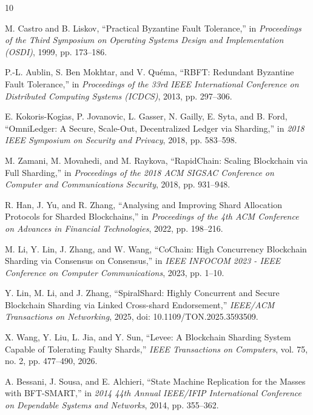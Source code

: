\documentclass[10pt,conference]{IEEEtran}
\begin{document}
\begin{thebibliography}{10}

M. Castro and B. Liskov, ``Practical Byzantine Fault Tolerance,'' in \emph{Proceedings of the Third Symposium on Operating Systems Design and Implementation (OSDI)}, 1999, pp. 173--186.

P.-L. Aublin, S. Ben Mokhtar, and V. Qu{\'e}ma, ``RBFT: Redundant Byzantine Fault Tolerance,'' in \emph{Proceedings of the 33rd IEEE International Conference on Distributed Computing Systems (ICDCS)}, 2013, pp. 297--306.

E. Kokoris-Kogias, P. Jovanovic, L. Gasser, N. Gailly, E. Syta, and B. Ford, ``OmniLedger: A Secure, Scale-Out, Decentralized Ledger via Sharding,'' in \emph{2018 IEEE Symposium on Security and Privacy}, 2018, pp. 583--598.

M. Zamani, M. Movahedi, and M. Raykova, ``RapidChain: Scaling Blockchain via Full Sharding,'' in \emph{Proceedings of the 2018 ACM SIGSAC Conference on Computer and Communications Security}, 2018, pp. 931--948.

R. Han, J. Yu, and R. Zhang, ``Analysing and Improving Shard Allocation Protocols for Sharded Blockchains,'' in \emph{Proceedings of the 4th ACM Conference on Advances in Financial Technologies}, 2022, pp. 198--216.

M. Li, Y. Lin, J. Zhang, and W. Wang, ``CoChain: High Concurrency Blockchain Sharding via Consensus on Consensus,'' in \emph{IEEE INFOCOM 2023 - IEEE Conference on Computer Communications}, 2023, pp. 1--10.

Y. Lin, M. Li, and J. Zhang, ``SpiralShard: Highly Concurrent and Secure Blockchain Sharding via Linked Cross-shard Endorsement,'' \emph{IEEE/ACM Transactions on Networking}, 2025, doi: 10.1109/TON.2025.3593509.

X. Wang, Y. Liu, L. Jia, and Y. Sun, ``Levee: A Blockchain Sharding System Capable of Tolerating Faulty Shards,'' \emph{IEEE Transactions on Computers}, vol. 75, no. 2, pp. 477--490, 2026.

A. Bessani, J. Sousa, and E. Alchieri, ``State Machine Replication for the Masses with BFT-SMART,'' in \emph{2014 44th Annual IEEE/IFIP International Conference on Dependable Systems and Networks}, 2014, pp. 355--362.

\end{thebibliography}
\end{document}
